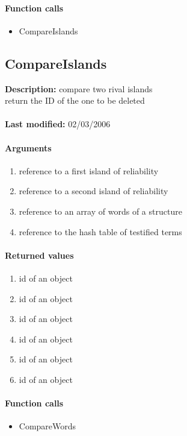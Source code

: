 \paragraph{Function calls}
\begin{itemize}
\item CompareIslands
\end{itemize}

\subsection{CompareIslands}
\textbf{Description:} compare two rival islands\\
return the ID of the one to be deleted\\
\\\textbf{Last modified:} 02/03/2006

\paragraph{Arguments}
\begin{enumerate}
\item reference to a first island of reliability
\item reference to a second island of reliability
\item reference to an array of words of a structure
\item reference to the hash table of testified terms
\end{enumerate}

\paragraph{Returned values}
\begin{enumerate}
\item id of an object
\item id of an object
\item id of an object
\item id of an object
\item id of an object
\item id of an object
\end{enumerate}

\paragraph{Function calls}
\begin{itemize}
\item CompareWords
\end{itemize}

